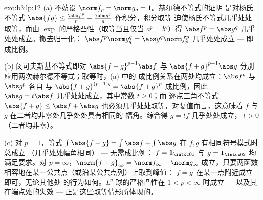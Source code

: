 \begin{solution}{exo:b3:lp:12}
(a) 不妨设 $\norm f_p = \norm g_q = 1$。赫尔德不等式的证明
是对杨氏不等式 $\abs{fg} \leq
\frac{\abs f^p}p + \frac{\abs g^q}q$ 作积分，积分取等
迫使杨氏不等式几乎处处取等，而由
$\exp$ 的严格凸性（取等当且仅当 $a^p = b^q$）得 $\abs
f^p = \abs g^q$ 几乎处处成立。撤去归一化：
$\abs f^p\norm g_q^q = \abs g^q\norm f_p^p$ 几乎处处成立 ---
即成比例。

(b) 闵可夫斯基不等式即对 $\abs{f + g}^{p-1}
\abs f$ 与 $\abs{f+g}^{p-1}\abs g$ 分别应用两次赫尔德不等式；取等时，(a) 中的
成比例关系在两处均成立：$\abs f^p$ 与 $\abs g^p$ 各自
与 $\abs{f+g}^{(p-1)q} = \abs{f+g}^p$ 成比例，因此
$\abs g = t\abs f$ 几乎处处成立，其中常数 $t \geq 0$；而
逐点三角不等式 $\abs{f + g} \leq
\abs f + \abs g$ 也必须几乎处处取等，对复值而言，这意味着
$f$ 与 $g$ 在二者均非零处几乎处处具有相同的
幅角。综合得 $g = tf$ 几乎处处成立，
$t > 0$（二者均非零）。

(c) 对 $p = 1$，等式 $\int\abs{f + g} = \int\abs f +
\int\abs g$ 在 $f, g$ 有相同符号模式时总成立
（几乎处处幅角相同） --- 无需成比例：
$f = \mathbf 1_{\intcc01}$ 与 $g = \mathbf 1_{\intcc02}$
均满足要求。对 $p = \infty$，$\norm{f+g}_\infty = \norm f_\infty +
\norm g_\infty$ 成立，只要两函数
相容地在某一公共点（或沿某公共点列）上取到峰值：
$f = g\,$ 在某一点附近成立即可，无论其他处
的行为如何。$L^p$ 球的严格凸性在 $1 <
p < \infty$ 时成立 --- 以及其在端点处的失效 ---
正是这些取等情形所体现的。
\end{solution}

